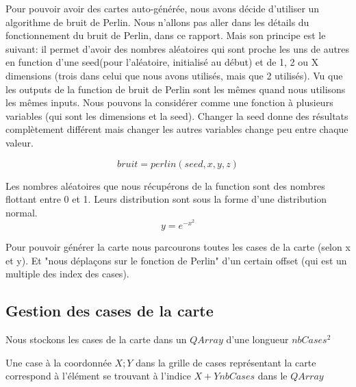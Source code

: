 \documentclass[a4paper,10pt,openany,oneside]{report}
\begin{document}
Pour pouvoir avoir des cartes auto-générée, nous avons décide d'utiliser un algorithme de bruit de Perlin. Nous n'allons pas aller dans les détails du fonctionnement du bruit de Perlin, dans ce rapport. Mais son principe est le suivant: il permet d'avoir des nombres aléatoires qui sont proche les uns de autres en function d'une seed(pour l'aléatoire, initialisé au début) et de 1, 2 ou X dimensions (trois dans celui que nous avons utilisés, mais que 2 utilisés). Vu que les outputs de la function de bruit de Perlin sont les mêmes quand nous utilisons les mêmes inputs. Nous pouvons la considérer comme une fonction à plusieurs variables (qui sont les dimensions et la seed). Changer la seed donne des résultats complètement différent mais changer les autres variables change peu entre chaque valeur.

\[bruit = perlin(seed, x, y, z)\]

Les nombres aléatoires que nous récupérons de la function sont des nombres flottant entre 0 et 1.
Leurs distribution sont sous la forme d'une distribution normal.
\[y=e^{-x^{2}}\]

Pour pouvoir générer la carte nous parcourons toutes les cases de la carte (selon x et y). Et "nous déplaçons sur le fonction de Perlin" d'un certain offset (qui est un multiple des index des cases).
\subsection{Gestion des cases de la carte}
Nous stockons les cases de la carte dans un $QArray$ d'une longueur $nbCases^{2}$

Une case à la coordonnée $X;Y$ dans la grille de cases représentant la carte correspond à l'élément se trouvant à l'indice $X+Y nbCases$ dans le $QArray$
\end{document}
